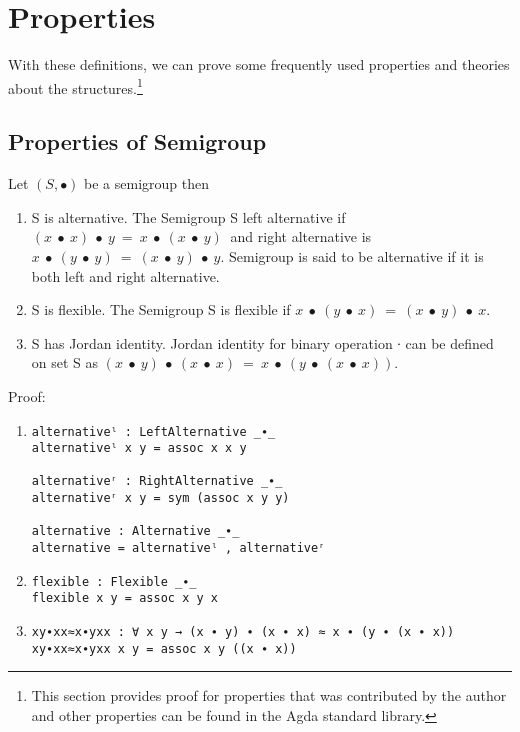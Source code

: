 \section{Properties}
With these definitions, we can prove some frequently used properties and theories
about the structures.\footnote{This section provides proof for properties that
was contributed by the author and other properties can be found in the Agda standard
library.}
\subsection{Properties of Semigroup}
Let $(S, ∙)$ be a semigroup then
\begin{enumerate}
\item S is alternative. The Semigroup S left alternative if \((x\ ∙\ x)\ ∙\ y\ =\ x\ ∙\ (x\ ∙\ y)\ \) and right alternative is
\(x\ ∙\ (y\ ∙\ y)\ =\ (x\ ∙\ y)\ ∙\ y\). Semigroup is
said to be alternative if it is both left and right alternative. 
\item S is flexible. The Semigroup S is flexible if \(x\ ∙\ (y\
∙\ x)\ =\ (x\ ∙\ y)\ ∙\ x\).
\item S has Jordan identity.  Jordan identity for binary operation ∙ can be
defined on set S as \((x\ ∙\ y)\ ∙\ (x\ ∙\ x)\ =\
x\ ∙\ (y\ ∙\ (x\ ∙\ x)). \)
\end{enumerate}
Proof:
\begin{enumerate}
\item
\begin{verbatim}
alternativeˡ : LeftAlternative _∙_
alternativeˡ x y = assoc x x y

alternativeʳ : RightAlternative _∙_
alternativeʳ x y = sym (assoc x y y)

alternative : Alternative _∙_
alternative = alternativeˡ , alternativeʳ
\end{verbatim}
 \item
\begin{verbatim}
flexible : Flexible _∙_
flexible x y = assoc x y x
\end{verbatim}
\item
\begin{verbatim}
xy∙xx≈x∙yxx : ∀ x y → (x ∙ y) ∙ (x ∙ x) ≈ x ∙ (y ∙ (x ∙ x))
xy∙xx≈x∙yxx x y = assoc x y ((x ∙ x))
\end{verbatim}
\end{enumerate}
